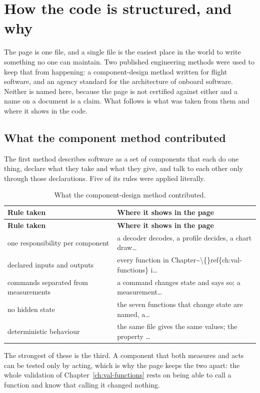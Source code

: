 \chapter{How the code is structured, and why}\label{ch:structure}

The page is one file, and a single file is the easiest place in the world to write
something no one can maintain. Two published engineering methods were used to keep
that from happening: a component-design method written for flight software, and an
agency standard for the architecture of onboard software. Neither is named here,
because the page is not certified against either and a name on a document is a
claim. What follows is what was taken from them and where it shows in the code.

\section{What the component method contributed}
The first method describes software as a set of components that each do one thing,
declare what they take and what they give, and talk to each other only through
those declarations. Five of its rules were applied literally.

{\small
\begin{xltabular}{\linewidth}{|X|l|}
\caption{What the component-design method contributed.}\label{tab:struct-component} \\
\toprule \textbf{Rule taken} & \textbf{Where it shows in the page} \\\midrule\endfirsthead
\toprule \textbf{Rule taken} & \textbf{Where it shows in the page} \\\midrule\endhead
one responsibility per component & a decoder decodes, a profile decides, a chart draw… \\
declared inputs and outputs & every function in Chapter\textasciitilde{}\textbackslash\{\}ref\{ch:val-functions\} i… \\
commands separated from measurements & a command changes state and says so; a measurement… \\
no hidden state & the seven functions that change state are named, a… \\
deterministic behaviour & the same file gives the same values; the property … \\
\bottomrule
\end{xltabular}}


The strongest of these is the third. A component that both measures and acts can
be tested only by acting, which is why the page keeps the two apart: the whole
validation of Chapter~\ref{ch:val-functions} rests on being able to call a function
and know that calling it changed nothing.

